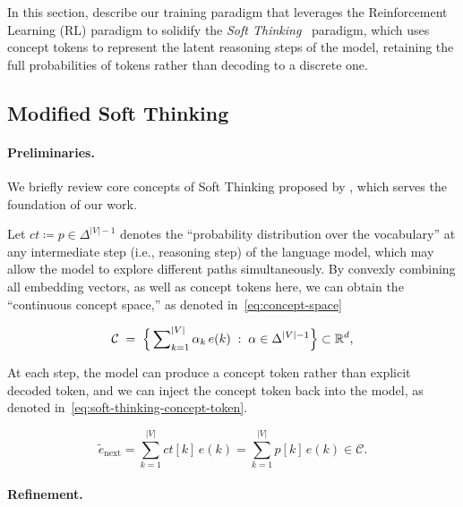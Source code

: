 In this section, describe our training paradigm that leverages the Reinforcement Learning (RL) paradigm to solidify the \emph{Soft Thinking}~\citep{zhang2025softthinkingunlockingreasoning} paradigm, which uses concept tokens to represent the latent reasoning steps of the model, retaining the full probabilities of tokens rather than decoding to a discrete one.

\subsection{Modified Soft Thinking}\label{subsec:modified-soft-thinking}

\paragraph{Preliminaries.}

We briefly review core concepts of Soft Thinking proposed
by \citeauthor{zhang2025softthinkingunlockingreasoning}, which serves the foundation of our work.

Let $ct \coloneqq p \in \Delta^{\left\lvert V\right\rvert - 1}$ denotes the ``probability distribution over the vocabulary'' at any intermediate step
(i.e., reasoning step) of the language model, which may allow the model to explore different paths simultaneously.
By convexly combining all embedding vectors, as well as concept tokens here, we can obtain the ``continuous concept space,'' as denoted in~\ref{eq:concept-space}

\begin{equation}
    \mathcal{C} \;=\;
    \Bigl\{\,\sum\nolimits_{k=1}^{|V|}\alpha_k\,e(k)\;:\;
    \alpha\in\Delta^{|V|-1}\Bigr\}\subset\mathbb{R}^d ,
    \label{eq:concept-space}
\end{equation}

At each step, the model can produce a concept token rather than explicit decoded token, and we can inject the concept token back into the model, as denoted in~\ref{eq:soft-thinking-concept-token}.

\begin{equation}
    \tilde{e}_{\mathrm{next}}
    = \sum_{k=1}^{|V|} ct[k]\,e(k) = \sum_{k=1}^{|V|} p[k]\,e(k)\in\mathcal{C}.
    \label{eq:soft-thinking-concept-token}
\end{equation}

\paragraph{Refinement.}

